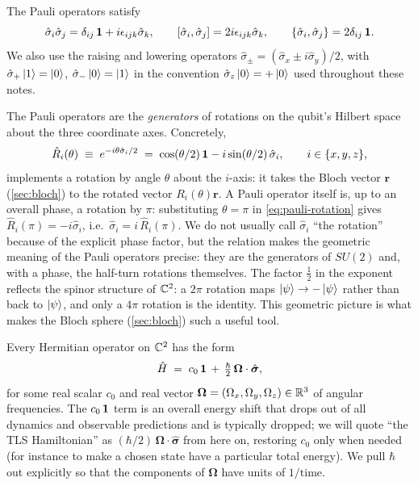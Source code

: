 The Pauli operators satisfy
\begin{equation}
\label{eq:pauli-algebra}
\hat\sigma_i\hat\sigma_j = \delta_{ij}\,\mathbf{1} + i\epsilon_{ijk}\hat\sigma_k,
\qquad
[\hat\sigma_i,\hat\sigma_j] = 2i\epsilon_{ijk}\hat\sigma_k,
\qquad
\{\hat\sigma_i,\hat\sigma_j\} = 2\delta_{ij}\,\mathbf{1}.
\end{equation}
We also use the raising and lowering operators
$\hat\sigma_\pm = (\hat\sigma_x\pm i\hat\sigma_y)/2$, with
$\hat\sigma_+\ket{1}=\ket{0}$, $\hat\sigma_-\ket{0}=\ket{1}$ in the
convention $\hat\sigma_z\ket{0}=+\ket{0}$ used throughout these notes.

\begin{remark}
The Pauli operators are the \emph{generators} of rotations on the
qubit's Hilbert space about the three coordinate axes. Concretely,
\begin{equation}
\label{eq:pauli-rotation}
\hat{R}_i(\theta) \;\equiv\; e^{-i\theta\hat\sigma_i/2}
\;=\; \cos(\theta/2)\,\mathbf{1} - i\sin(\theta/2)\,\hat\sigma_i,
\qquad i\in\{x,y,z\},
\end{equation}
implements a rotation by angle $\theta$ about the $i$-axis: it
takes the Bloch vector $\bm{r}$ (\cref{sec:bloch}) to the rotated
vector $R_i(\theta)\bm{r}$. A Pauli operator itself is, up to an
overall phase, a rotation by $\pi$: substituting $\theta=\pi$ in
\cref{eq:pauli-rotation} gives $\hat{R}_i(\pi)=-i\hat\sigma_i$,
i.e.\ $\hat\sigma_i = i\,\hat{R}_i(\pi)$. We do not usually call
$\hat\sigma_i$ ``the rotation'' because of the explicit phase
factor, but the relation makes the geometric meaning of the Pauli
operators precise: they are the generators of $SU(2)$ and, with a
phase, the half-turn rotations themselves. The factor $\frac12$ in
the exponent reflects the spinor structure of $\mathbb{C}^2$: a $2\pi$
rotation maps $\ket{\psi}\to-\ket{\psi}$ rather than back to
$\ket{\psi}$, and only a $4\pi$ rotation is the identity. This
geometric picture is what makes the Bloch sphere
(\cref{sec:bloch}) such a useful tool.
\end{remark}

\begin{statement}
\label{stmt:tls-hamiltonian}
Every Hermitian operator on $\mathbb{C}^2$ has the form
\begin{equation}
\label{eq:tls-h}
\hat{H} \;=\; c_0\,\mathbf{1} \,+\, \tfrac{\hbar}{2}\,\bm{\Omega}\cdot\hat{\bm{\sigma}},
\end{equation}
for some real scalar $c_0$ and real vector
$\bm{\Omega}=(\Omega_x,\Omega_y,\Omega_z)\in\mathbb{R}^3$ of angular
frequencies. The $c_0\,\mathbf{1}$ term is an overall energy shift that
drops out of all dynamics and observable predictions and is
typically dropped; we will quote ``the TLS Hamiltonian'' as
$(\hbar/2)\,\bm{\Omega}\cdot\hat{\bm{\sigma}}$ from here on,
restoring $c_0$ only when needed (for instance to make a chosen
state have a particular total energy). We pull $\hbar$ out
explicitly so that the components of $\bm{\Omega}$ have units of
$1/\text{time}$.
\end{statement}

